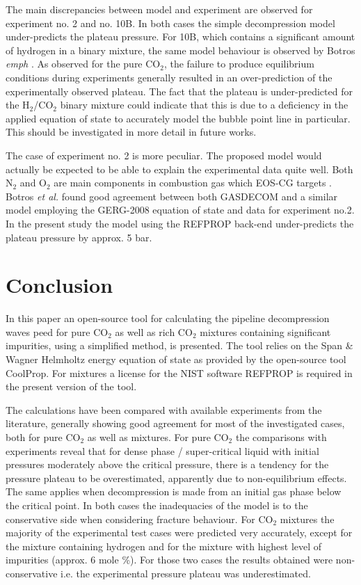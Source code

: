\documentclass[a4paper, 10pt, twocolumn, twoside]{scrartcl}
\begin{document}
The main discrepancies between model and experiment are observed for experiment no. 2 and no. 10B. In both cases the simple decompression model under-predicts the plateau pressure. For 10B, which contains a significant amount of hydrogen in a binary mixture, the same model behaviour is observed by Botros \emph{emph} \cite{Botros_mixture}. As observed for the pure CO$_2$, the failure to produce equilibrium conditions during experiments generally resulted in an over-prediction of the experimentally observed plateau. The fact that the plateau is under-predicted for the H$_2$/CO$_2$ binary mixture could indicate that this is due to a deficiency in the applied equation of state to accurately model the bubble point line in particular. This should be investigated in more detail in future works. 

The case of experiment no. 2 is more peculiar. The proposed model would actually be expected to be able to explain the experimental data quite well. Both N$_2$ and O$_2$ are main components in combustion gas which EOS-CG targets \cite{Gernert2016,Herrig2018}. Botros \emph{et al.} found good agreement between both GASDECOM \cite{Cosham_GASDECOM} and a similar model employing the GERG-2008 equation of state \cite{Kunz2012} and data for experiment no.2. In the present study the model using the REFPROP back-end under-predicts the plateau pressure by approx. 5 bar.   

\section{Conclusion}
In this paper an open-source tool for calculating the pipeline decompression waves peed for pure CO$_2$ as well as rich CO$_2$ mixtures containing significant impurities, using a simplified method, is presented. The tool relies on the Span \& Wagner Helmholtz energy equation of state as provided by the open-source tool CoolProp. For mixtures a license for the NIST software REFPROP is required in the present version of the tool. 

The calculations have been compared with available experiments from the literature, generally showing good agreement for most of the investigated cases, both for pure CO$_2$ as well as mixtures. For pure CO$_2$ the comparisons with experiments reveal that for dense phase / super-critical liquid with initial pressures moderately above the critical pressure, there is a tendency for the pressure plateau to be overestimated, apparently due to non-equilibrium effects. The same applies when decompression is made from an initial gas phase below the critical point.  In both cases the inadequacies of the model is to the conservative side when considering fracture behaviour. For CO$_2$ mixtures the majority of the experimental test cases were predicted very accurately, except for the mixture containing hydrogen and for the mixture with highest level of impurities (approx. 6 mole \%). For those two cases the results obtained were non-conservative i.e. the experimental pressure plateau was underestimated. 
\end{document}
